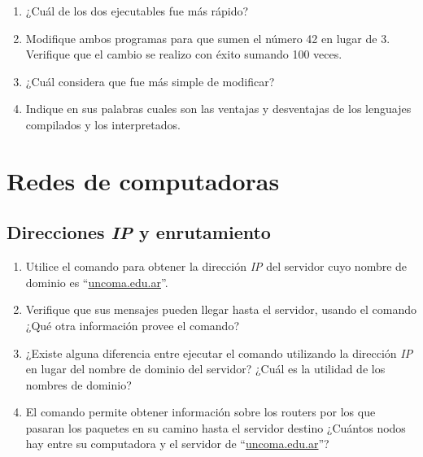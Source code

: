 \documentclass[12pt]{article}
\begin{document}
\begin{enumerate}[resume]

    \item ¿Cuál de los dos ejecutables fue más rápido?

    \item Modifique ambos programas para que sumen el número 42 en lugar de 3.
        Verifique que el cambio se realizo con éxito sumando 100 veces.

    \item ¿Cuál considera que fue más simple de modificar?

    \item Indique en sus palabras cuales son las ventajas y desventajas de los
        lenguajes compilados y los interpretados.

\end{enumerate}

\section{Redes de computadoras}

\subsection{Direcciones \emph{IP} y enrutamiento}

\begin{enumerate}[resume]

    \item Utilice el comando  para obtener la dirección \emph{IP} del
        servidor cuyo nombre de dominio es ``\url{uncoma.edu.ar}''.

    \item Verifique que sus mensajes pueden llegar hasta el servidor, usando
        el comando\\
         ¿Qué otra información provee el comando?

    \item ¿Existe alguna diferencia entre ejecutar el comando 
        utilizando la dirección \emph{IP} en lugar del nombre de dominio del
        servidor? ¿Cuál es la utilidad de los nombres de dominio?

    \item El comando  permite obtener información sobre los
        routers por los que pasaran los paquetes en su camino hasta el
        servidor destino ¿Cuántos nodos hay entre su computadora y el servidor
        de ``\url{uncoma.edu.ar}''?

\end{enumerate}
\end{document}

